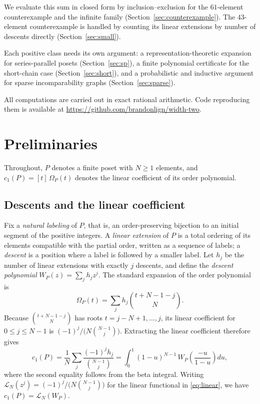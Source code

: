 \documentclass[11pt]{amsart}
\theoremstyle{remark}
\numberwithin{equation}{section}
\newcommand{\lin}{c_1}
\begin{document}
We evaluate this sum in closed form by inclusion--exclusion for the
$61$-element counterexample and the infinite family
(Section~\ref{sec:counterexample}). The $43$-element counterexample is handled
by counting its linear extensions by number of descents directly
(Section~\ref{sec:small}).

Each positive class needs its own argument: a
representation-theoretic expansion for series-parallel posets
(Section~\ref{sec:sp}), a finite polynomial certificate for the short-chain
case (Section~\ref{sec:short}), and a probabilistic and inductive argument for
sparse incomparability graphs (Section~\ref{sec:sparse}).

All computations are carried out in exact rational arithmetic. Code reproducing
them is available at \url{https://github.com/brandonlign/width-two}.

\section{Preliminaries}\label{sec:prelim}

Throughout, $P$ denotes a finite poset with $N\ge1$ elements, and
$\lin(P)=[t]\,\Omega_P(t)$ denotes the linear coefficient of its order
polynomial.

\subsection{Descents and the linear coefficient}
Fix a \emph{natural labeling} of $P$, that is, an order-preserving bijection to
an initial segment of the positive integers. A \emph{linear extension} of $P$
is a total ordering of its elements compatible with the partial order, written
as a sequence of labels; a \emph{descent} is a position where a label is
followed by a smaller label. Let $h_j$ be the number of linear extensions with
exactly $j$ descents, and define the \emph{descent polynomial}
$W_P(z)=\sum_j h_jz^j$. The standard expansion of the order
polynomial~\cite[Section~3.15]{EC1} is
\[
 \Omega_P(t)=\sum_j h_j\binom{t+N-1-j}{N}.
\]
Because $\binom{t+N-1-j}{N}$ has roots $t=j-N+1,\dots,j$, its linear
coefficient for $0\le j\le N-1$ is $(-1)^j/\bigl(N\binom{N-1}{j}\bigr)$.
Extracting the linear coefficient therefore gives
\begin{equation}\label{eq:linear}
 \lin(P)=\frac1N\sum_j\frac{(-1)^jh_j}{\binom{N-1}{j}}
 =\int_0^1(1-u)^{N-1}\,W_P\!\left(\frac{-u}{1-u}\right)du,
\end{equation}
where the second equality follows from the beta integral. Writing
$\mathcal L_N(z^j)=(-1)^j/\bigl(N\binom{N-1}{j}\bigr)$ for the linear functional
in \eqref{eq:linear}, we have $\lin(P)=\mathcal L_N(W_P)$.
\end{document}
